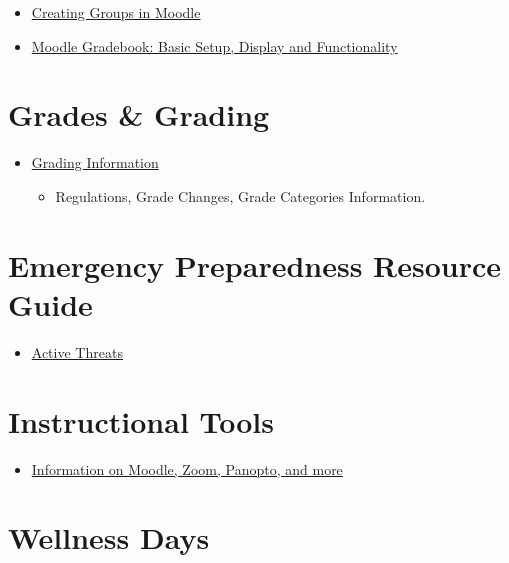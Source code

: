 \documentclass[
]{book}
\providecommand{\tightlist}{%
  \setlength{\itemsep}{0pt}\setlength{\parskip}{0pt}}
\begin{document}
\begin{itemize}
\tightlist
\item
  \href{https://ncsu.service-now.com/kb_view.do?sysparm_article=KB0020552}{Creating Groups in Moodle}
\item
  \href{https://teaching-resources.delta.ncsu.edu/moodle-gradebook/\#moodle}{Moodle Gradebook: Basic Setup, Display and Functionality}
\end{itemize}

\section{Grades \& Grading}\label{grades-grading}

\begin{itemize}
\tightlist
\item
  \href{https://registrar.ncsu.edu/facultygradinginfo/}{Grading Information}

  \begin{itemize}
  \tightlist
  \item
    Regulations, Grade Changes, Grade Categories Information.
  \end{itemize}
\end{itemize}

\section{Emergency Preparedness Resource Guide}\label{emergency-preparedness-resource-guide}

\begin{itemize}
\tightlist
\item
  \href{https://docs.google.com/document/d/1mIo_5NfuIwv8UYRubB7fdnDF1jShu14y3uZkY0gjX1Q/edit?usp=sharing}{Active Threats}
\end{itemize}

\section{Instructional Tools}\label{instructional-tools}

\begin{itemize}
\tightlist
\item
  \href{https://delta.ncsu.edu/learning-technology/instructional-tools/}{Information on Moodle, Zoom, Panopto, and more}
\end{itemize}

\section{Wellness Days}\label{wellness-days}
\end{document}
